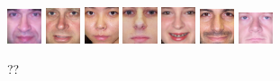 \begin{figure}[H]
\includegraphics[width=0.09\textwidth]{img/fdResult1/output85.png}
\includegraphics[width=0.09\textwidth]{img/fdResult1/output91.png}
\includegraphics[width=0.09\textwidth]{img/fdResult1/output92.png}
\includegraphics[width=0.09\textwidth]{img/fdResult1/output95.png}
\includegraphics[width=0.09\textwidth]{img/fdResult1/output96.png}
\includegraphics[width=0.09\textwidth]{img/fdResult1/output97.png}
\includegraphics[width=0.09\textwidth]{img/fdResult1/output98.png}


\caption{??}
\label{fig:faces}
\end{figure}
